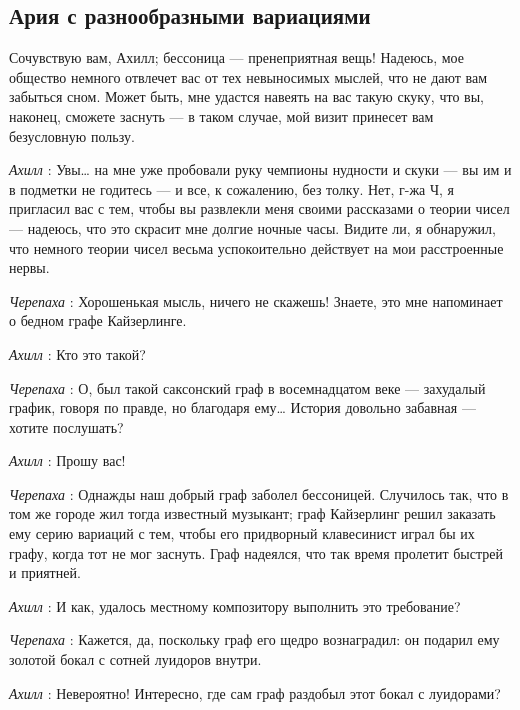 \documentclass[../main.tex]{subfiles}
\begin{document}
\subsection{Ария с разнообразными вариациями}


\begin{dialogue}

 Сочувствую вам, Ахилл; бессоница --- пренеприятная вещь! Надеюсь, мое общество немного отвлечет вас от тех невыносимых мыслей, что не дают вам забыться сном. Может быть, мне удастся навеять на вас такую скуку, что вы, наконец, сможете заснуть --- в таком случае, мой визит принесет вам безусловную пользу.

\emph{Ахилл} : Увы\ldots{} на мне уже пробовали руку чемпионы нудности и скуки --- вы им и в подметки не годитесь --- и все, к сожалению, без толку. Нет, г-жа Ч, я пригласил вас с тем, чтобы вы развлекли меня своими рассказами о теории чисел --- надеюсь, что это скрасит мне долгие ночные часы. Видите ли, я обнаружил, что немного теории чисел весьма успокоительно действует на мои расстроенные нервы.

\emph{Черепаха} : Хорошенькая мысль, ничего не скажешь! Знаете, это мне напоминает о бедном графе Кайзерлинге.

\emph{Ахилл} : Кто это такой?

\emph{Черепаха} : О, был такой саксонский граф в восемнадцатом веке --- захудалый график, говоря по правде, но благодаря ему\ldots{} История довольно забавная --- хотите послушать?

\emph{Ахилл} : Прошу вас!

\emph{Черепаха} : Однажды наш добрый граф заболел бессоницей. Случилось так, что в том же городе жил тогда известный музыкант; граф Кайзерлинг решил заказать ему серию вариаций с тем, чтобы его придворный клавесинист играл бы их графу, когда тот не мог заснуть. Граф надеялся, что так время пролетит быстрей и приятней.

\emph{Ахилл} : И как, удалось местному композитору выполнить это требование?

\emph{Черепаха} : Кажется, да, поскольку граф его щедро вознаградил: он подарил ему золотой бокал с сотней луидоров внутри.

\emph{Ахилл} : Невероятно! Интересно, где сам граф раздобыл этот бокал с луидорами?


\end{dialogue}
\end{document}
